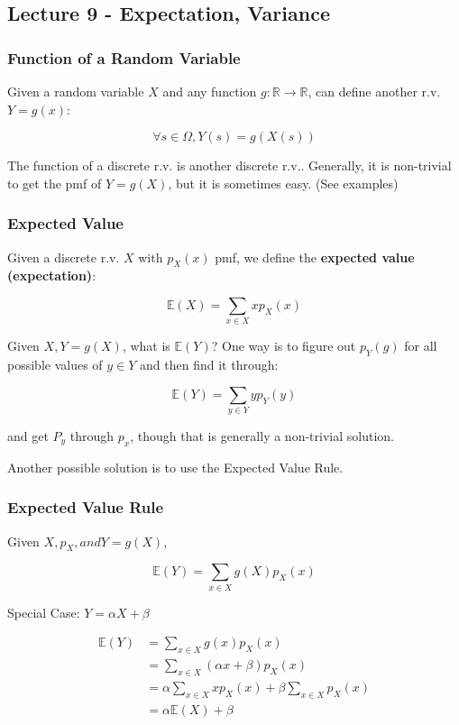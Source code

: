 \documentclass{article}
\begin{document}
\subsection{Lecture 9 - Expectation, Variance}

\subsubsection{Function of a Random Variable}

Given a random variable $X$ and any function $g : \mathbb{R}
\rightarrow \mathbb{R}$, can define another r.v. $Y = g(x)$:

\[
  \forall s \in \Omega, Y(s) = g(X(s))
\]

The function of a discrete r.v. is another discrete r.v.. Generally,
it is non-trivial to get the pmf of $Y=g(X)$, but it is sometimes
easy. (See examples)

\subsubsection{Expected Value}

Given a discrete r.v. $X$ with $p_X(x)$ pmf, we define the
\textbf{expected value (expectation)}:

\begin{equation}
  \tag{Expected Value Definition}
  \boxed{
    \mathbb{E}(X) = \sum\limits_{x \in X} x p_X(x)
  }
\end{equation}

Given $X, Y = g(X)$, what is $\mathbb{E}(Y)$? One way is to figure out
$p_Y(g)$ for all possible values of $y \in Y$ and then find it
through:

\[
  \mathbb{E}(Y) = \sum\limits_{y \in Y} y p_Y(y)
\]

and get $P_y$ through $p_x$, though that is generally a non-trivial
solution.

Another possible solution is to use the Expected Value Rule.

\subsubsection{Expected Value Rule}

Given $X, p_X, and Y=g(X)$,

\begin{equation}
  \tag{Expected Value Rule}
  \boxed{
    \mathbb{E}(Y) = \sum\limits_{x \in X} g(X) p_X(x)
  }
\end{equation}

Special Case: $Y = \alpha X + \beta$

\[
  \begin{aligned}
    \mathbb{E}(Y)
    &= \sum\limits_{x \in X} g(x) p_X(x) \\
    &= \sum\limits_{x \in X} (\alpha x + \beta) p_X(x) \\
    &= \alpha \sum\limits_{x \in X} x p_X(x) + \beta \sum\limits_{x
      \in X} p_X(x) \\
    &= \alpha \mathbb{E}(X) + \beta
    
  \end{aligned}
\]
\end{document}
